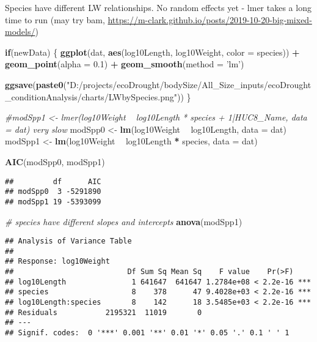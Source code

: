 \documentclass[
  landscape]{article}
\newenvironment{Shaded}{\begin{snugshade}}{\end{snugshade}}
\newcommand{\CommentTok}[1]{\textcolor[rgb]{0.56,0.35,0.01}{\textit{#1}}}
\newcommand{\ControlFlowTok}[1]{\textcolor[rgb]{0.13,0.29,0.53}{\textbf{#1}}}
\newcommand{\DataTypeTok}[1]{\textcolor[rgb]{0.13,0.29,0.53}{#1}}
\newcommand{\FloatTok}[1]{\textcolor[rgb]{0.00,0.00,0.81}{#1}}
\newcommand{\KeywordTok}[1]{\textcolor[rgb]{0.13,0.29,0.53}{\textbf{#1}}}
\newcommand{\NormalTok}[1]{#1}
\newcommand{\OperatorTok}[1]{\textcolor[rgb]{0.81,0.36,0.00}{\textbf{#1}}}
\newcommand{\StringTok}[1]{\textcolor[rgb]{0.31,0.60,0.02}{#1}}
\begin{document}
Species have different LW relationships. No random effects yet - lmer
takes a long time to run (may try bam,
\url{https://m-clark.github.io/posts/2019-10-20-big-mixed-models/})

\begin{Shaded}
\begin{Highlighting}[]
\ControlFlowTok{if}\NormalTok{(newData) \{}
    \KeywordTok{ggplot}\NormalTok{(dat, }\KeywordTok{aes}\NormalTok{(log10Length, log10Weight, }\DataTypeTok{color =}\NormalTok{ species)) }\OperatorTok{+}
\StringTok{    }\KeywordTok{geom_point}\NormalTok{(}\DataTypeTok{alpha =} \FloatTok{0.1}\NormalTok{) }\OperatorTok{+}
\StringTok{    }\KeywordTok{geom_smooth}\NormalTok{(}\DataTypeTok{method =} \StringTok{'lm'}\NormalTok{) }
   
    \KeywordTok{ggsave}\NormalTok{(}\KeywordTok{paste0}\NormalTok{(}\StringTok{"D:/projects/ecoDrought/bodySize/All_Size_inputs/ecoDrought_conditionAnalysis/charts/LWbySpecies.png"}\NormalTok{))}
\NormalTok{\}}

\CommentTok{#modSpp1 <- lmer(log10Weight ~ log10Length * species + 1|HUC8_Name, data = dat) very slow}
\NormalTok{modSpp0 <-}\StringTok{ }\KeywordTok{lm}\NormalTok{(log10Weight }\OperatorTok{~}\StringTok{ }\NormalTok{log10Length, }\DataTypeTok{data =}\NormalTok{ dat)}
\NormalTok{modSpp1 <-}\StringTok{ }\KeywordTok{lm}\NormalTok{(log10Weight }\OperatorTok{~}\StringTok{ }\NormalTok{log10Length }\OperatorTok{*}\StringTok{ }\NormalTok{species, }\DataTypeTok{data =}\NormalTok{ dat)}


\KeywordTok{AIC}\NormalTok{(modSpp0, modSpp1)}
\end{Highlighting}
\end{Shaded}

\begin{verbatim}
##         df      AIC
## modSpp0  3 -5291890
## modSpp1 19 -5393099
\end{verbatim}

\begin{Shaded}
\begin{Highlighting}[]
\CommentTok{# species have different slopes and intercepts}
\KeywordTok{anova}\NormalTok{(modSpp1)}
\end{Highlighting}
\end{Shaded}

\begin{verbatim}
## Analysis of Variance Table
## 
## Response: log10Weight
##                          Df Sum Sq Mean Sq    F value    Pr(>F)    
## log10Length               1 641647  641647 1.2784e+08 < 2.2e-16 ***
## species                   8    378      47 9.4028e+03 < 2.2e-16 ***
## log10Length:species       8    142      18 3.5485e+03 < 2.2e-16 ***
## Residuals           2195321  11019       0                         
## ---
## Signif. codes:  0 '***' 0.001 '**' 0.01 '*' 0.05 '.' 0.1 ' ' 1
\end{verbatim}
\end{document}

